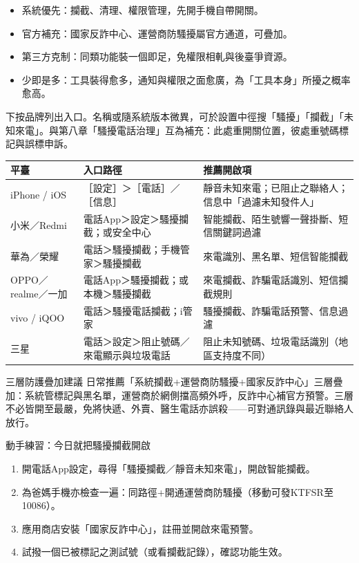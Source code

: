 \begin{itemize}
  \item 系統優先：攔截、清理、權限管理，先開手機自帶開關。
  \item 官方補充：國家反詐中心、運營商防騷擾屬官方通道，可疊加。
  \item 第三方克制：同類功能裝一個即足，免權限相軋與後臺爭資源。
  \item 少即是多：工具裝得愈多，通知與權限之面愈廣，為「工具本身」所擾之概率愈高。
\end{itemize}


下按品牌列出入口。名稱或隨系統版本微異，可於設置中徑搜「騷擾」「攔截」「未知來電」。與第八章「騷擾電話治理」互為補充：此處重開關位置，彼處重號碼標記與誤標申訴。

\begin{center}
\begin{tabularx}{\linewidth}{|X|X|X|}
\hline
\textbf{平臺} & \textbf{入口路徑} & \textbf{推薦開啟項} \tabularnewline
\hline
iPhone / iOS & ［設定］＞［電話］／［信息］ & 靜音未知來電；已阻止之聯絡人；信息中「過濾未知發件人」 \tabularnewline
小米／Redmi & 電話App＞設定＞騷擾攔截；或安全中心 & 智能攔截、陌生號響一聲掛斷、短信關鍵詞過濾 \tabularnewline
華為／榮耀 & 電話＞騷擾攔截；手機管家＞騷擾攔截 & 來電識別、黑名單、短信智能攔截 \tabularnewline
OPPO／realme／一加 & 電話App＞騷擾攔截；或本機＞騷擾攔截 & 來電攔截、詐騙電話識別、短信攔截規則 \tabularnewline
vivo / iQOO & 電話＞騷擾電話攔截；i管家 & 騷擾攔截、詐騙電話預警、信息過濾 \tabularnewline
三星 & 電話＞設定＞阻止號碼／來電顯示與垃圾電話 & 阻止未知號碼、垃圾電話識別（地區支持度不同） \tabularnewline
\hline
\end{tabularx}
\end{center}

\begin{tcbinfo}{三層防護疊加建議}
日常推薦「系統攔截+運營商防騷擾+國家反詐中心」三層疊加：系統管標記與黑名單，運營商於網側擋高頻外呼，反詐中心補官方預警。三層不必皆開至最嚴，免將快遞、外賣、醫生電話亦誤殺——可對通訊錄與最近聯絡人放行。

\end{tcbinfo}

\begin{tcbpractice}{動手練習：今日就把騷擾攔截開啟}
\begin{enumerate}
  \item 開電話App設定，尋得「騷擾攔截／靜音未知來電」，開啟智能攔截。
  \item 為爸媽手機亦檢查一遍：同路徑+開通運營商防騷擾（移動可發KTFSR至10086）。
  \item 應用商店安裝「國家反詐中心」，註冊並開啟來電預警。
  \item 試撥一個已被標記之測試號（或看攔截記錄），確認功能生效。
\end{enumerate}

\end{tcbpractice}

